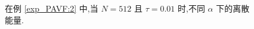 \documentclass[aspectratio=169]{beamer}
\numberwithin{theorem}{section} %
\begin{document}
\begin{frame}%
	\begin{figure}[H]
		\begin{center}
		\caption{在例 \ref{exp_PAVF:2} 中,当 $N = 512$ 且 $\tau=0.01$ 时,不同 $\alpha$ 下的离散能量.}
		\label{fig_PAVF:3}
		\end{center}
		\end{figure}
\end{frame}
\end{document}
